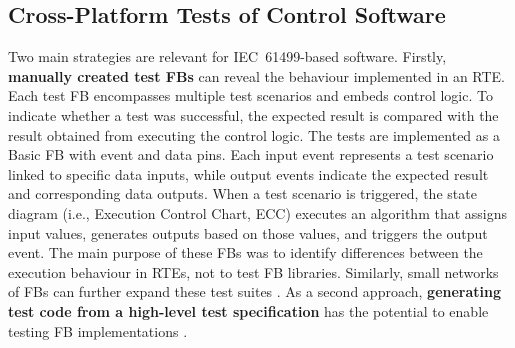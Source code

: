 \subsection{Cross-Platform Tests of Control Software}
Two main strategies are relevant for IEC~61499-based software. Firstly, \textbf{manually created test FBs} \cite{Testing_Midhun} can reveal the behaviour implemented in an RTE. Each test FB encompasses multiple test scenarios and embeds control logic. To indicate whether a test was successful, the expected result is compared with the result obtained from executing the control logic. The tests are implemented as a Basic FB with event and data pins. Each input event represents a test scenario linked to specific data inputs, while output events indicate the expected result and corresponding data outputs. When a test scenario is triggered, the state diagram (i.e., Execution Control Chart, ECC) executes an algorithm that assigns input values, generates outputs based on those values, and triggers the output event. The main purpose of these FBs was to identify differences between the execution behaviour in RTEs, not to test FB libraries. Similarly, small networks of FBs can further expand these test suites \cite{pfefferkorn,Wiesmayr.2023}. 
As a second approach, \textbf{generating test code from a high-level test specification} has the potential to enable testing FB implementations \cite{biancaMidhunETFAwip}.